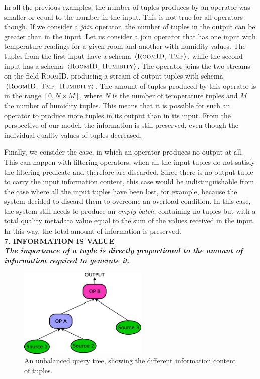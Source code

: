 In all the previous examples, the number of tuples produces by an operator was smaller or equal to the
number in the input. This is not true for all operators though. If we consider a \textit{join} operator,
the number of tuples in the output can be greater than in the input. Let us consider a join
operator that has one input with temperature readings for a given room and another with
humidity values. The tuples from the first input have a schema $\langle\textsc{RoomID, Tmp} \rangle$,
while the second input has a schema $\langle\textsc{RoomID, Humidity}\rangle$. The operator joins the two
streams on the field \textsc{RoomID}, producing a stream of output tuples with schema
$\langle\textsc{RoomID, Tmp, Humidity}\rangle$. The amount of tuples produced by this operator is in the
range $[0, N{\times} M]$, where $N$ is the number of temperature tuples and $M$ the number of humidity
tuples.
This means that it is possible for such an operator to produce more tuples in its output than in its
input. From the perspective of our model, the information is still preserved, even though the individual
quality values of tuples decreased.

 	Finally, we consider the case, in which an operator produces no output at all. This can happen
 	with filtering operators, when all the input tuples do not satisfy the filtering predicate and therefore
 	are discarded. Since there is no output tuple to carry the input information content, this case
 	would be indistinguishable from the case where all the input tuples have been lost, for example, because the
 	system decided to discard them to overcome an overload condition. In this case, the system
 	still needs to produce an \textit{empty batch}, containing no tuples but with a total quality metadata
 	value equal to the sum of the values received in the input. In this way, the total amount of
 	information is preserved. \\

\textbf{7. INFORMATION IS VALUE \\ \textit{The importance of a tuple is directly proportional to the
amount of information required to generate it.}}

\begin{figure}[b!]
	\centering
	\includegraphics[width=0.55\textwidth]{img/tesi/unbalanced-tree_senza}
	\caption{An unbalanced query tree, showing the different information content of tuples.}
	\label{fig:unbalanced-tree}
\end{figure}


